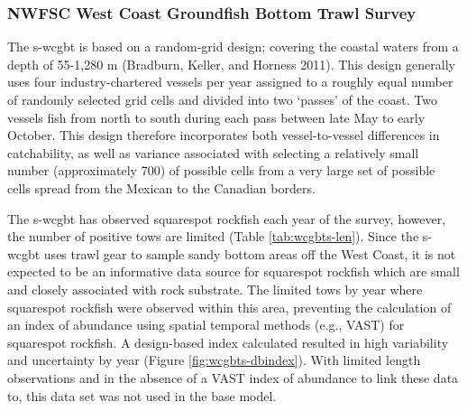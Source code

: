 \documentclass[11pt,
  english,
  a4paper,
]{article}
\begin{document}
\leavevmode\tagmcend\tagstructend\par


\hypertarget{nwfsc-west-coast-groundfish-bottom-trawl-survey}{%
\subsubsection{NWFSC West Coast Groundfish Bottom Trawl Survey}\label{nwfsc-west-coast-groundfish-bottom-trawl-survey}}

\leavevmode\tagmcend\tagstructend


The \gls{s-wcgbt} is based on a random-grid design; covering the coastal waters from a depth of 55-1,280 m {(Bradburn, Keller, and Horness 2011)\leavevmode\tagmcend\tagstructend}. This design generally uses four industry-chartered vessels per year assigned to a roughly equal number of randomly selected grid cells and divided into two `passes' of the coast. Two vessels fish from north to south during each pass between late May to early October. This design therefore incorporates both vessel-to-vessel differences in catchability, as well as variance associated with selecting a relatively small number (approximately 700) of possible cells from a very large set of possible cells spread from the Mexican to the Canadian borders.

\leavevmode\tagmcend\tagstructend\par


The \gls{s-wcgbt} has observed squarespot rockfish each year of the survey, however, the number of positive tows are limited (Table \ref{tab:wcgbts-len}). Since the \Gls{s-wcgbt} uses trawl gear to sample sandy bottom areas off the West Coast, it is not expected to be an informative data source for squarespot rockfish which are small and closely associated with rock substrate. The limited tows by year where squarespot rockfish were observed within this area, preventing the calculation of an index of abundance using spatial temporal methods (e.g., VAST) for squarespot rockfish. A design-based index calculated resulted in high variability and uncertainty by year (Figure \ref{fig:wcgbts-dbindex}). With limited length observations and in the absence of a VAST index of abundance to link these data to, this data set was not used in the base model.
\end{document}
